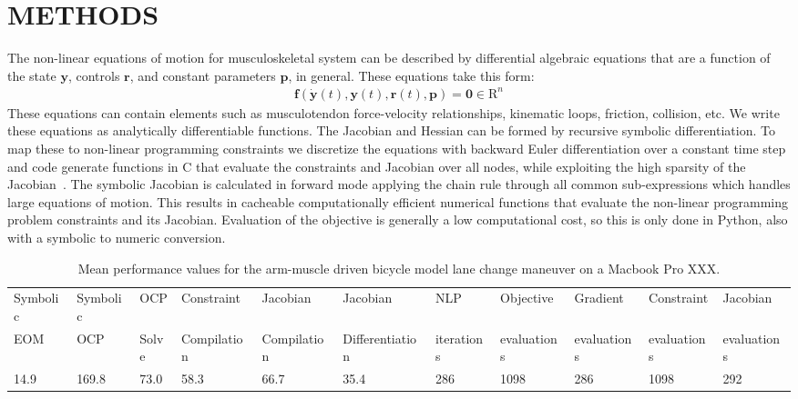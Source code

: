 \documentclass[11pt,twocolumn]{article}
\begin{document}
\section*{METHODS}
%
The non-linear equations of motion for musculoskeletal system can be described
by differential algebraic equations that are a function of the state
\(\mathbf{y}\), controls \(\mathbf{r}\), and constant parameters
\(\mathbf{p}\), in general. These equations take this form:
%
\begin{align}
  \mathbf{f}(\dot{\mathbf{y}}(t), \mathbf{y}(t), \mathbf{r}(t), \mathbf{p}) =
  \mathbf{0} \in \mathrm{R}^n
\end{align}
%
These equations can contain elements such as musculotendon force-velocity
relationships, kinematic loops, friction, collision, etc. We write these
equations as analytically differentiable functions. The Jacobian and Hessian can
be formed by recursive symbolic differentiation. To map these to non-linear
programming constraints we discretize the equations with backward Euler
differentiation over a constant time step and code generate functions in C that
evaluate the constraints and Jacobian over all nodes, while exploiting the high
sparsity of the Jacobian~\cite{Moore2018}. The symbolic Jacobian is calculated
in forward mode applying the chain rule through all common sub-expressions which
handles large equations of motion. This results in cacheable computationally
efficient numerical functions that evaluate the non-linear programming problem
constraints and its Jacobian. Evaluation of the objective is generally a low
computational cost, so this is only done in Python, also with a symbolic to
numeric conversion.
%
\begin{table}[t]
  \centering
  \caption{Mean performance values for the arm-muscle driven bicycle model lane
  change maneuver on a Macbook Pro XXX.}
  \scriptsize
  \begin{tabular}{lllllllllll}
    Symbolic & Symbolic & OCP & Constraint & Jacobian  & Jacobian & NLP & Objective &  Gradient & Constraint & Jacobian \\
    EOM & OCP & Solve & Compilation &  Compilation & Differentiation & iterations & evaluations & evaluations & evaluations & evaluations \\
    14.9 & 169.8 & 73.0 & 58.3 & 66.7 & 35.4 & 286 & 1098 & 286 & 1098 & 292
  \end{tabular}
  \label{tab:performance}
\end{table}
\end{document}
